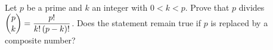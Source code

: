 Let $p$ be a prime and $k$ an integer with $0<k<p$. Prove that $p$ divides $\dbinom pk=\dfrac{p!}{k!\,(p-k)!}$. Does the statement remain true if $p$ is replaced by a composite number?
